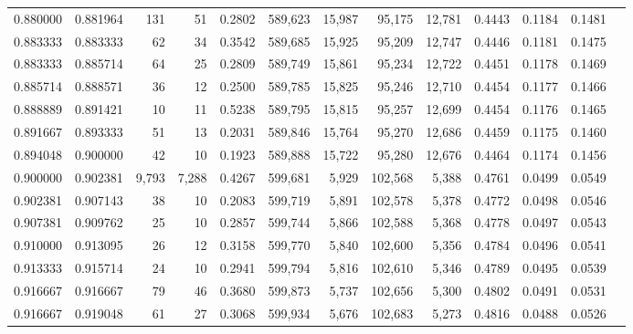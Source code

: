 \begin{tabular}{rrrrrrrrrrrrr}
0.880000 & 0.881964 &    131 &     51 &                                     0.2802 & 589,623 &  15,987 &  95,175 &  12,781 & 0.4443 & 0.1184 & 0.1481 \\
0.883333 & 0.883333 &     62 &     34 &                                     0.3542 & 589,685 &  15,925 &  95,209 &  12,747 & 0.4446 & 0.1181 & 0.1475 \\
0.883333 & 0.885714 &     64 &     25 &                                     0.2809 & 589,749 &  15,861 &  95,234 &  12,722 & 0.4451 & 0.1178 & 0.1469 \\
0.885714 & 0.888571 &     36 &     12 &                                     0.2500 & 589,785 &  15,825 &  95,246 &  12,710 & 0.4454 & 0.1177 & 0.1466 \\
0.888889 & 0.891421 &     10 &     11 &                                     0.5238 & 589,795 &  15,815 &  95,257 &  12,699 & 0.4454 & 0.1176 & 0.1465 \\
0.891667 & 0.893333 &     51 &     13 &                                     0.2031 & 589,846 &  15,764 &  95,270 &  12,686 & 0.4459 & 0.1175 & 0.1460 \\
0.894048 & 0.900000 &     42 &     10 &                                     0.1923 & 589,888 &  15,722 &  95,280 &  12,676 & 0.4464 & 0.1174 & 0.1456 \\
0.900000 & 0.902381 &  9,793 &  7,288 &                                     0.4267 & 599,681 &   5,929 & 102,568 &   5,388 & 0.4761 & 0.0499 & 0.0549 \\
0.902381 & 0.907143 &     38 &     10 &                                     0.2083 & 599,719 &   5,891 & 102,578 &   5,378 & 0.4772 & 0.0498 & 0.0546 \\
0.907381 & 0.909762 &     25 &     10 &                                     0.2857 & 599,744 &   5,866 & 102,588 &   5,368 & 0.4778 & 0.0497 & 0.0543 \\
0.910000 & 0.913095 &     26 &     12 &                                     0.3158 & 599,770 &   5,840 & 102,600 &   5,356 & 0.4784 & 0.0496 & 0.0541 \\
0.913333 & 0.915714 &     24 &     10 &                                     0.2941 & 599,794 &   5,816 & 102,610 &   5,346 & 0.4789 & 0.0495 & 0.0539 \\
0.916667 & 0.916667 &     79 &     46 &                                     0.3680 & 599,873 &   5,737 & 102,656 &   5,300 & 0.4802 & 0.0491 & 0.0531 \\
0.916667 & 0.919048 &     61 &     27 &                                     0.3068 & 599,934 &   5,676 & 102,683 &   5,273 & 0.4816 & 0.0488 & 0.0526 \\

\end{tabular}
